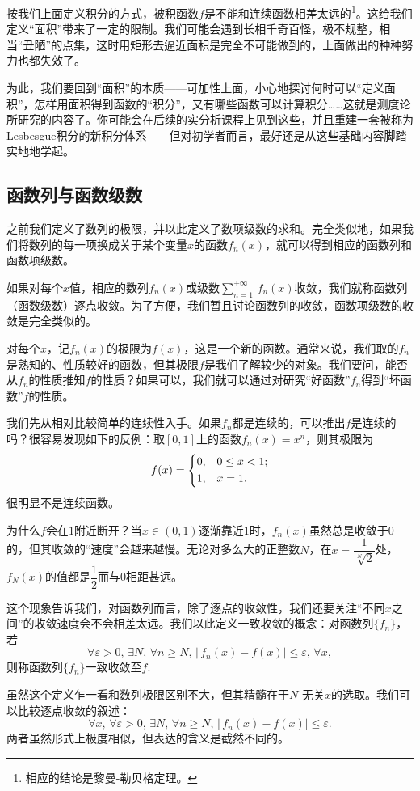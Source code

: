 按我们上面定义积分的方式，被积函数$f$是不能和连续函数相差太远的\footnote{相应的结论是黎曼-勒贝格定理。}。这给我们定义“面积”带来了一定的限制。我们可能会遇到长相千奇百怪，极不规整，相当“丑陋”的点集，这时用矩形去逼近面积是完全不可能做到的，上面做出的种种努力也都失效了。

为此，我们要回到“面积”的本质——可加性上面，小心地探讨何时可以“定义面积”，怎样用面积得到函数的“积分”，又有哪些函数可以计算积分……这就是测度论所研究的内容了。你可能会在后续的实分析课程上见到这些，并且重建一套被称为Lesbesgue积分的新积分体系——但对初学者而言，最好还是从这些基础内容脚踏实地地学起。
\subsection{函数列与函数级数}
之前我们定义了数列的极限，并以此定义了数项级数的求和。完全类似地，如果我们将数列的每一项换成关于某个变量$x$的函数$f_n(x)$，就可以得到相应的函数列和函数项级数。

如果对每个$x$值，相应的数列$f_n(x)$或级数$\sum_{n=1}^{+\infty}\,f_n(x)$收敛，我们就称函数列（函数级数）逐点收敛。为了方便，我们暂且讨论函数列的收敛，函数项级数的收敛是完全类似的。

对每个$x$，记$f_n(x)$的极限为$f(x)$，这是一个新的函数。通常来说，我们取的$f_n$是熟知的、性质较好的函数，但其极限$f$是我们了解较少的对象。我们要问，能否从$f_n$的性质推知$f$的性质？如果可以，我们就可以通过对研究“好函数”$f_n$得到“坏函数”$f$的性质。

我们先从相对比较简单的连续性入手。如果$f_n$都是连续的，可以推出$f$是连续的吗？很容易发现如下的反例：取$[0,1]$上的函数$f_n(x)=x^n$，则其极限为
\[f(x)=
    \begin{dcases}
        0, & 0\leq x< 1; \\
        1, & x=1.
    \end{dcases}
\]
很明显不是连续函数。

为什么$f$会在$1$附近断开？当$x\in(0,1)$逐渐靠近$1$时，$f_n(x)$虽然总是收敛于$0$的，但其收敛的“速度”会越来越慢。无论对多么大的正整数$N$，在$x=\dfrac {1}{\sqrt[N]{2}}$处，$f_N(x)$的值都是$\dfrac 12$而与$0$相距甚远。

这个现象告诉我们，对函数列而言，除了逐点的收敛性，我们还要关注“不同$x$之间”的收敛速度会不会相差太远。我们以此定义一致收敛的概念：对函数列$\{f_n\}$，若
\[\forall \varepsilon>0,\,\exists N,\,\forall n\geq N,\,\bigl|\,f_n(x)-f(x)\bigr|\leq \varepsilon,\,\forall x,\]
则称函数列$\{f_n\}$一致收敛至$f$.

虽然这个定义乍一看和数列极限区别不大，但其精髓在于$N$ 无关$x$的选取。我们可以比较逐点收敛的叙述：
\[\forall x,\,\forall \varepsilon>0,\,\exists N,\,\forall n\geq N,\,|\,f_n(x)-f(x)|\leq \varepsilon.\]
两者虽然形式上极度相似，但表达的含义是截然不同的。

